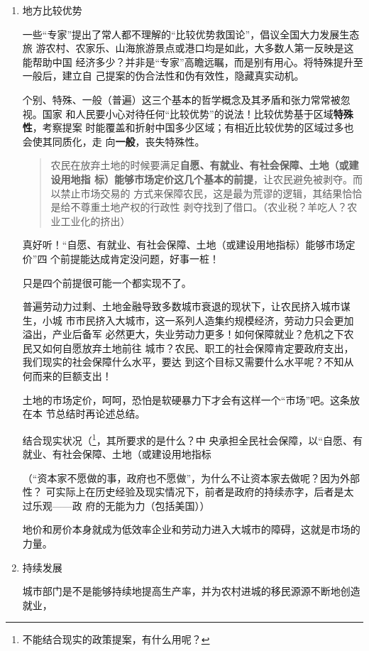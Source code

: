 \begin{enumerate}
\item 地方比较优势

  一些“专家”提出了常人都不理解的“比较优势救国论”，倡议全国大力发展生态旅
  游农村、农家乐、山海旅游景点或港口均是如此，大多数人第一反映是这能帮助中国
  经济多少？并非是“专家”高瞻远瞩，而是别有用心。将特殊提升至一般后，建立自
  己提案的伪合法性和伪有效性，隐藏真实动机。

  个别、特殊、一般（普遍）这三个基本的哲学概念及其矛盾和张力常常被忽视。国家
  和人民要小心对待任何“比较优势”的说法！比较优势基于区域\textbf{特殊性}，考察提案
  时能覆盖和折射中国多少区域；有相近比较优势的区域过多也会使其同质化，走
  向\textbf{一般}，丧失特殊性。

  \begin{quotation}
    农民在放弃土地的时候要满足\textbf{自愿、有就业、有社会保障、土地（或建设用地指
      标）能够市场定价这几个基本的前提}，让农民避免被剥夺。而以禁止市场交易的
    方式来保障农民，这是最为荒谬的逻辑，其结果恰恰是给不尊重土地产权的行政性
    剥夺找到了借口。（农业税？羊吃人？农业工业化的挤出）
  \end{quotation}

  真好听！“自愿、有就业、有社会保障、土地（或建设用地指标）能够市场定价”四
  个前提能达成肯定没问题，好事一桩！

  只是四个前提很可能一个都实现不了。

  普遍劳动力过剩、土地金融导致多数城市衰退的现状下，让农民挤入城市谋生，小城
  市市民挤入大城市，这一系列人造集约规模经济，劳动力只会更加溢出，产业后备军
  必然更大，失业劳动力更多！如何保障就业？危机之下农民又如何自愿放弃土地前往
  城市？农民、职工的社会保障肯定要政府支出，我们现实的社会保障什么水平，要达
  到这个目标又需要什么水平呢？不知从何而来的巨额支出！

  土地的市场定价，呵呵，恐怕是软硬暴力下才会有这样一个“市场”吧。这条放在本
  节总结时再论述总结。

  结合现实状况（\footnote{不能结合现实的政策提案，有什么用呢？}，其所要求的是什么？中
  央承担全民社会保障，以“自愿、有就业、有社会保障、土地（或建设用地指标

  （“资本家不愿做的事，政府也不愿做”，为什么不让资本家去做呢？因为外部性？
  可实际上在历史经验及现实情况下，前者是政府的持续赤字，后者是太过乐观——政
  府的无能为力（包括美国））

  地价和房价本身就成为低效率企业和劳动力进入大城市的障碍，这就是市场的力量。

\item 持续发展


  城市部门是不是能够持续地提高生产率，并为农村进城的移民源源不断地创造就业，



\end{enumerate}
